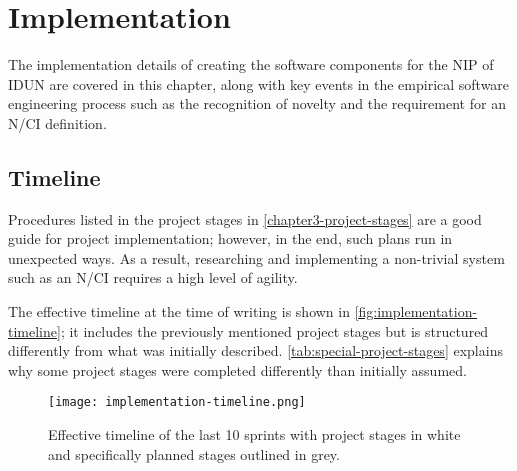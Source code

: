 \chapter{Implementation}
\graphicspath{{Chapter4/Figs/}{Chapter4/Figs/}}

The implementation details of creating the software components for the NIP of IDUN are covered in this chapter, along with key events in the empirical software engineering process such as the recognition of novelty and the requirement for an N/CI definition.

\section{Timeline}
\label{chapter4-timeline}

Procedures listed in the project stages in \autoref{chapter3-project-stages} are a good guide for project implementation; however, in the end, such plans run in unexpected ways. As a result, researching and implementing a non-trivial system such as an N/CI requires a high level of agility.

The effective timeline at the time of writing is shown in \autoref{fig:implementation-timeline}; it includes the previously mentioned project stages but is structured differently from what was initially described. \autoref{tab:special-project-stages} explains why some project stages were completed differently than initially assumed.

\begin{figure}[!ht]
  \centering
  \texttt{[image: implementation-timeline.png]}
  \caption{Effective timeline of the last 10 sprints with project stages in white and specifically planned stages outlined in grey.}
  \label{fig:implementation-timeline}
\end{figure}

